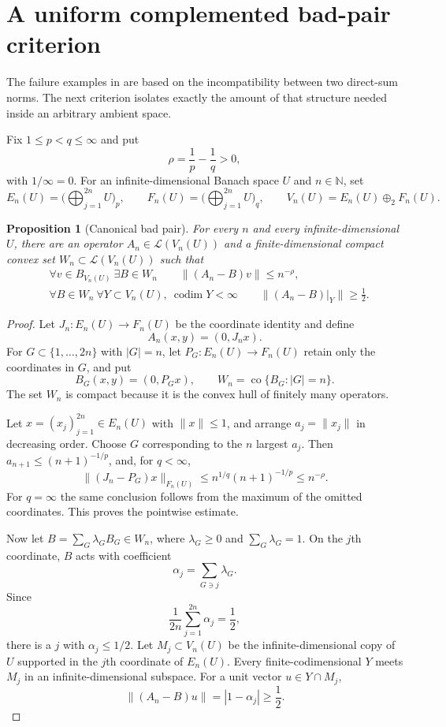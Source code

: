 \documentclass[11pt]{article}
\newtheorem{proposition}[theorem]{Proposition}
\theoremstyle{definition}
\theoremstyle{remark}
\newcommand{\LL}{\mathcal{L}}
\newcommand{\N}{\mathbb{N}}
\newcommand{\co}{\operatorname{co}}
\newcommand{\codim}{\operatorname{codim}}
\begin{document}
\section{A uniform complemented bad-pair criterion}

The failure examples in \cite{AGLM} are based on the incompatibility between two direct-sum norms.  The next criterion isolates exactly the amount of that structure needed inside an arbitrary ambient space.

Fix $1\leq p<q\leq\infty$ and put
\[
  \rho=\frac1p-\frac1q>0,
\]
with $1/\infty=0$.  For an infinite-dimensional Banach space $U$ and $n\in\N$, set
\[
  E_n(U)=\Big(\bigoplus_{j=1}^{2n}U\Big)_p,
  \qquad
  F_n(U)=\Big(\bigoplus_{j=1}^{2n}U\Big)_q,
  \qquad
  V_n(U)=E_n(U)\oplus_2 F_n(U).
\]

\begin{proposition}[Canonical bad pair]\label{prop:canonical}
For every $n$ and every infinite-dimensional $U$, there are an operator $A_n\in\LL(V_n(U))$ and a finite-dimensional compact convex set $W_n\subset\LL(V_n(U))$ such that
\begin{align*}
  &\forall v\in B_{V_n(U)}\ \exists B\in W_n
       \qquad \|(A_n-B)v\|\leq n^{-\rho}, \\
  &\forall B\in W_n\ \forall Y\subset V_n(U),\ \codim Y<\infty
       \qquad \|(A_n-B)|_Y\|\geq \frac12.
\end{align*}
\end{proposition}

\begin{proof}
Let $J_n:E_n(U)\to F_n(U)$ be the coordinate identity and define
\[
  A_n(x,y)=(0,J_nx).
\]
For $G\subset\{1,\dots,2n\}$ with $|G|=n$, let $P_G:E_n(U)\to F_n(U)$ retain only the coordinates in $G$, and put
\[
  B_G(x,y)=(0,P_Gx),
  \qquad
  W_n=\co\{B_G:|G|=n\}.
\]
The set $W_n$ is compact because it is the convex hull of finitely many operators.

Let $x=(x_j)_{j=1}^{2n}\in E_n(U)$ with $\|x\|\leq1$, and arrange $a_j=\|x_j\|$ in decreasing order.  Choose $G$ corresponding to the $n$ largest $a_j$.  Then $a_{n+1}\leq(n+1)^{-1/p}$, and, for $q<\infty$,
\[
  \|(J_n-P_G)x\|_{F_n(U)}
  \leq n^{1/q}(n+1)^{-1/p}
  \leq n^{-\rho}.
\]
For $q=\infty$ the same conclusion follows from the maximum of the omitted coordinates.  This proves the pointwise estimate.

Now let $B=\sum_G\lambda_GB_G\in W_n$, where $\lambda_G\geq0$ and $\sum_G\lambda_G=1$.  On the $j$th coordinate, $B$ acts with coefficient
\[
  \alpha_j=\sum_{G\ni j}\lambda_G.
\]
Since
\[
  \frac1{2n}\sum_{j=1}^{2n}\alpha_j=\frac12,
\]
there is a $j$ with $\alpha_j\leq1/2$.  Let $M_j\subset V_n(U)$ be the infinite-dimensional copy of $U$ supported in the $j$th coordinate of $E_n(U)$.  Every finite-codimensional $Y$ meets $M_j$ in an infinite-dimensional subspace.  For a unit vector $u\in Y\cap M_j$,
\[
  \|(A_n-B)u\|=|1-\alpha_j|\geq\frac12.
\]
\end{proof}
\end{document}
